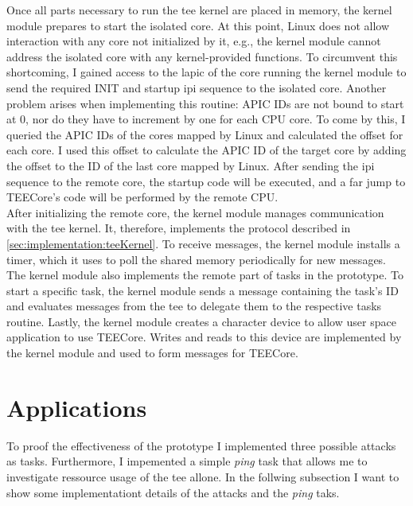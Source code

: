 Once all parts necessary to run the \gls{tee} kernel are placed in memory, the
kernel module prepares to start the isolated core. At this point, Linux does not
allow interaction with any core not initialized by it, e.g., the kernel module
cannot address the isolated core with any kernel-provided functions. To
circumvent this shortcoming, I gained access to the \gls{lapic} of the core
running the kernel module to send the required INIT and startup \gls{ipi}
sequence to the isolated core. Another problem arises when implementing this
routine: APIC IDs are not bound to start at 0, nor do they have to increment by
one for each CPU core. To come by this, I queried the APIC IDs of the cores
mapped by Linux and calculated the offset for each core. I used this offset to
calculate the APIC ID of the target core by adding the offset to the ID of the
last core mapped by Linux. After sending the \gls{ipi} sequence to the remote
core, the startup code will be executed, and a far jump to TEECore's code will
be performed by the remote CPU.\\

After initializing the remote core, the kernel module manages communication with
the \gls{tee} kernel. It, therefore, implements the protocol described in
\ref{sec:implementation:teeKernel}. To receive messages, the kernel module
installs a timer, which it uses to poll the shared memory periodically for new
messages. The kernel module also implements the remote part of tasks in the
prototype. To start a specific task, the kernel module sends a message
containing the task's ID and evaluates messages from the \gls{tee} to delegate
them to the respective tasks routine. Lastly, the kernel module creates a
character device to allow user space application to use TEECore. Writes and
reads to this device are implemented by the kernel module and used to form
messages for TEECore.

\section{Applications}
\label{sec:implementation:attacks}
To proof the effectiveness of the prototype I implemented three possible attacks
as tasks. Furthermore, I impemented a simple \textit{ping} task that allows me
to investigate ressource usage of the \gls{tee} allone. In the follwing
subsection I want to show some implementationt details of the attacks and the
\textit{ping} taks.

